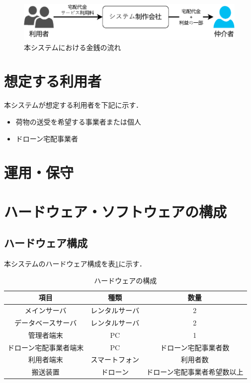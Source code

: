 \documentclass[a4paper, titlepage]{jsarticle}
\begin{document}
\begin{figure}[H]
  \centering
  \includegraphics[width=0.6\linewidth]{./money_flow.pdf}
  \caption{本システムにおける金銭の流れ}
  \label{fig:money_flow_1}
\end{figure}


\section{想定する利用者}
本システムが想定する利用者を下記に示す．
\begin{itemize}
        \item 荷物の送受を希望する事業者または個人
        \item ドローン宅配事業者
\end{itemize}

\section{運用・保守}

\section{ハードウェア・ソフトウェアの構成}
\subsection{ハードウェア構成}
本システムのハードウェア構成を表\ref{fig:hardware}に示す．
\begin{table}[H]
 \begin{center}
  \caption{ハードウェアの構成}
    \label{fig:hardware}
  \begin{tabular}{ccc} \hline
    項目 & 種類 & 数量 \\ \hline \hline
    メインサーバ & レンタルサーバ & 2 \\
    データベースサーバ & レンタルサーバ & 2 \\
    管理者端末 & PC & 1 \\
    ドローン宅配事業者端末 & PC & ドローン宅配事業者数 \\
    利用者端末 & スマートフォン & 利用者数 \\
    搬送装置 & ドローン & ドローン宅配事業者希望数以上 \\ \hline
  \end{tabular}
 \end{center}
\end{table}
\end{document}

